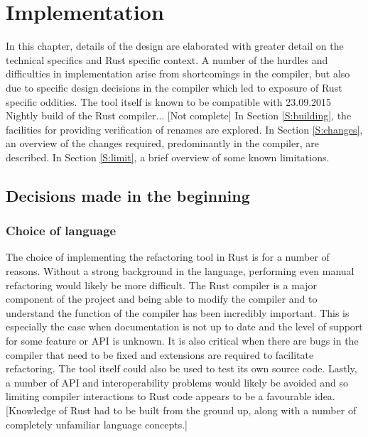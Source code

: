 \chapter{Implementation}\label{C:impl}

In this chapter, details of the design are elaborated with greater detail on the technical specifics and Rust specific context. A number of the hurdles and difficulties in implementation arise from shortcomings in the compiler, but also due to specific design decisions in the compiler which led to exposure of Rust specific oddities. The tool itself is known to be compatible with 23.09.2015 Nightly build of the Rust compiler... [Not complete] In Section \ref{S:building}, the facilities for providing verification of renames are explored. In Section \ref{S:changes}, an overview of the changes required, predominantly in the compiler, are described. In Section \ref{S:limit}, a brief overview of some known limitations.



\section{Decisions made in the beginning}
\subsection{Choice of language}
The choice of implementing the refactoring tool in Rust is for a number of reasons. Without a strong background in the language, performing even manual refactoring would likely be more difficult. The Rust compiler is a major component of the project and being able to modify the compiler and to understand the function of the compiler has been incredibly important. This is especially the case when documentation is not up to date and the level of support for some feature or API is unknown. It is also critical when there are bugs in the compiler that need to be fixed and extensions are required to facilitate refactoring. The tool itself could also be used to test its own source code. Lastly, a number of API and interoperability problems would likely be avoided and so limiting compiler interactions to Rust code appears to be a favourable idea. [Knowledge of Rust had to be built from the ground up, along with a number of completely unfamiliar language concepts.]

